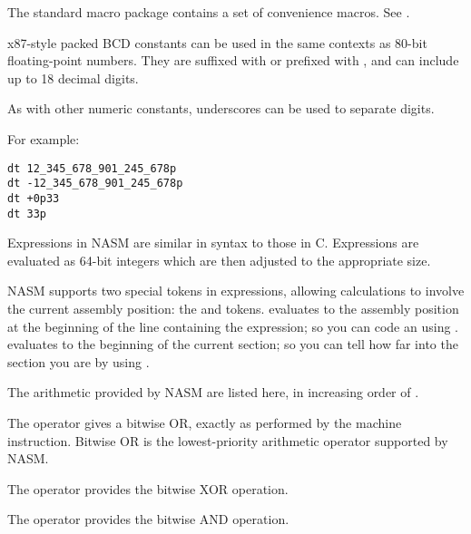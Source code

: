 The  standard macro package contains a set of convenience
macros. See .


x87-style packed BCD constants can be used in the same contexts as
80-bit floating-point numbers. They are suffixed with  or
prefixed with , and can include up to 18 decimal digits.

As with other numeric constants, underscores can be used
to separate digits.

For example:

\begin{lstlisting}
dt 12_345_678_901_245_678p
dt -12_345_678_901_245_678p
dt +0p33
dt 33p
\end{lstlisting}


Expressions in NASM are similar in syntax to those in C. Expressions
are evaluated as 64-bit integers which are then adjusted to the
appropriate size.

NASM supports two special tokens in expressions, allowing
calculations to involve the current assembly position: the
\index{\$}\code{\$} and \codeindex{\$\$} tokens.
\code{\$} evaluates to the assembly position at the beginning
of the line containing the expression; so you can code an
 using . \code{\$\$}
evaluates to the beginning of the current section; so you can
tell how far into the section you are by using \code{(\$-\$\$)}.

The arithmetic  provided by NASM are listed here,
in increasing order of .


The \code{|} operator gives a bitwise OR, exactly as performed by the
 machine instruction. Bitwise OR is the lowest-priority
arithmetic operator supported by NASM.


The \code{\textasciicircum} operator provides the bitwise XOR operation.


The \code{\&} operator provides the bitwise AND operation.

